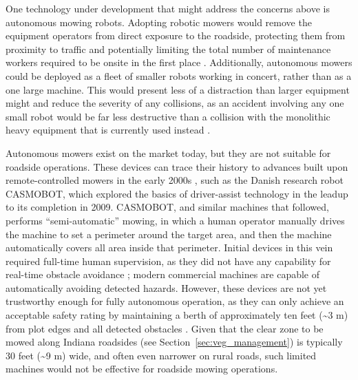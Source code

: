 \documentclass[
]{article}
\begin{document}
One technology under development that might address the concerns above
is autonomous mowing robots. Adopting robotic mowers would remove the
equipment operators from direct exposure to the roadside, protecting
them from proximity to traffic and potentially limiting the total number
of maintenance workers required to be onsite in the first place
\parencite{Arsenault_AutonomousMowingImproving_2010}. Additionally,
autonomous mowers could be deployed as a fleet of smaller robots working
in concert, rather than as a one large machine. This would present less
of a distraction than larger equipment might
\parencite{Creed_ImplementationValidationObstacle_2011} and reduce the
severity of any collisions, as an accident involving any one small robot
would be far less destructive than a collision with the monolithic heavy
equipment that is currently used instead
\parencite{Mardikes_AutonomousRoadsideMowing_2023}.

Autonomous mowers exist on the market today, but they are not suitable
for roadside operations. These devices can trace their history to
advances built upon remote-controlled mowers in the early 2000s
\parencite{Chavez_StudyObjectDetection_2009}, such as the Danish research
robot CASMOBOT, which explored the basics of driver-assist technology in
the leadup to its completion in 2009. CASMOBOT, and similar machines
that followed, performs ``semi-automatic'' mowing, in which a human
operator manually drives the machine to set a perimeter around the
target area, and then the machine automatically covers all area inside
that perimeter. Initial devices in this vein required full-time human
supervision, as they did not have any capability for real-time obstacle
avoidance \parencite{Jensen_ComputerAssistedSlope_2009}; modern
commercial machines are capable of automatically avoiding detected
hazards. However, these devices are not yet trustworthy enough for fully
autonomous operation, as they can only achieve an acceptable safety
rating by maintaining a berth of approximately ten feet
(\textasciitilde3 m) from plot edges and all detected obstacles
\parencite{Mardikes_ConstructingDigitalTwin_2025}. Given that the clear
zone to be mowed along Indiana roadsides (see
Section~\ref{sec:veg_management}) is typically 30 feet (\textasciitilde9
m) wide, and often even narrower on rural roads, such limited machines
would not be effective for roadside mowing operations.
\end{document}
